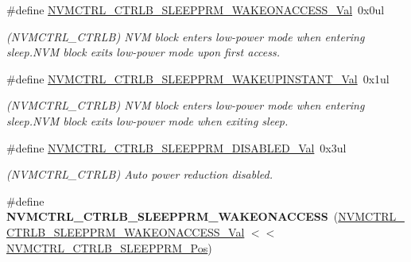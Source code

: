 \begin{DoxyCompactItemize}
\item 
\hypertarget{group___s_a_m_l21___n_v_m_c_t_r_l_gaa1ab6787e59eac433c25ac307dd7a2aa}{}\#define \hyperlink{group___s_a_m_l21___n_v_m_c_t_r_l_gaa1ab6787e59eac433c25ac307dd7a2aa}{N\+V\+M\+C\+T\+R\+L\+\_\+\+C\+T\+R\+L\+B\+\_\+\+S\+L\+E\+E\+P\+P\+R\+M\+\_\+\+W\+A\+K\+E\+O\+N\+A\+C\+C\+E\+S\+S\+\_\+\+Val}~0x0ul\label{group___s_a_m_l21___n_v_m_c_t_r_l_gaa1ab6787e59eac433c25ac307dd7a2aa}

\begin{DoxyCompactList}\small\item\em (N\+V\+M\+C\+T\+R\+L\+\_\+\+C\+T\+R\+L\+B) N\+V\+M block enters low-\/power mode when entering sleep.\+N\+V\+M block exits low-\/power mode upon first access. \end{DoxyCompactList}\item 
\hypertarget{group___s_a_m_l21___n_v_m_c_t_r_l_ga45d3a8b31b16b2b1204de0b61e5c12fc}{}\#define \hyperlink{group___s_a_m_l21___n_v_m_c_t_r_l_ga45d3a8b31b16b2b1204de0b61e5c12fc}{N\+V\+M\+C\+T\+R\+L\+\_\+\+C\+T\+R\+L\+B\+\_\+\+S\+L\+E\+E\+P\+P\+R\+M\+\_\+\+W\+A\+K\+E\+U\+P\+I\+N\+S\+T\+A\+N\+T\+\_\+\+Val}~0x1ul\label{group___s_a_m_l21___n_v_m_c_t_r_l_ga45d3a8b31b16b2b1204de0b61e5c12fc}

\begin{DoxyCompactList}\small\item\em (N\+V\+M\+C\+T\+R\+L\+\_\+\+C\+T\+R\+L\+B) N\+V\+M block enters low-\/power mode when entering sleep.\+N\+V\+M block exits low-\/power mode when exiting sleep. \end{DoxyCompactList}\item 
\hypertarget{group___s_a_m_l21___n_v_m_c_t_r_l_ga2a6e0082abe992f41fe1e646e0b6b52a}{}\#define \hyperlink{group___s_a_m_l21___n_v_m_c_t_r_l_ga2a6e0082abe992f41fe1e646e0b6b52a}{N\+V\+M\+C\+T\+R\+L\+\_\+\+C\+T\+R\+L\+B\+\_\+\+S\+L\+E\+E\+P\+P\+R\+M\+\_\+\+D\+I\+S\+A\+B\+L\+E\+D\+\_\+\+Val}~0x3ul\label{group___s_a_m_l21___n_v_m_c_t_r_l_ga2a6e0082abe992f41fe1e646e0b6b52a}

\begin{DoxyCompactList}\small\item\em (N\+V\+M\+C\+T\+R\+L\+\_\+\+C\+T\+R\+L\+B) Auto power reduction disabled. \end{DoxyCompactList}\item 
\hypertarget{group___s_a_m_l21___n_v_m_c_t_r_l_ga65e9f8270f7eaf6119d83c67049d63cc}{}\#define {\bfseries N\+V\+M\+C\+T\+R\+L\+\_\+\+C\+T\+R\+L\+B\+\_\+\+S\+L\+E\+E\+P\+P\+R\+M\+\_\+\+W\+A\+K\+E\+O\+N\+A\+C\+C\+E\+S\+S}~(\hyperlink{group___s_a_m_l21___n_v_m_c_t_r_l_gaa1ab6787e59eac433c25ac307dd7a2aa}{N\+V\+M\+C\+T\+R\+L\+\_\+\+C\+T\+R\+L\+B\+\_\+\+S\+L\+E\+E\+P\+P\+R\+M\+\_\+\+W\+A\+K\+E\+O\+N\+A\+C\+C\+E\+S\+S\+\_\+\+Val} $<$$<$ \hyperlink{group___s_a_m_l21___n_v_m_c_t_r_l_gac7d2e32d78d79b7a7b67e1f6aa1571df}{N\+V\+M\+C\+T\+R\+L\+\_\+\+C\+T\+R\+L\+B\+\_\+\+S\+L\+E\+E\+P\+P\+R\+M\+\_\+\+Pos})\label{group___s_a_m_l21___n_v_m_c_t_r_l_ga65e9f8270f7eaf6119d83c67049d63cc}


\end{DoxyCompactItemize}

